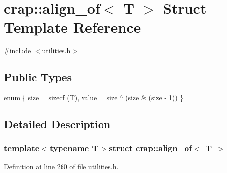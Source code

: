 \hypertarget{structcrap_1_1align__of}{\section{crap\+:\+:align\+\_\+of$<$ T $>$ Struct Template Reference}
\label{structcrap_1_1align__of}
}


{\ttfamily \#include $<$utilities.\+h$>$}

\subsection*{Public Types}
\begin{DoxyCompactItemize}
\item 
enum \{ \hyperlink{structcrap_1_1align__of_ae6e1e0ba0f4e74c10d92aa8849e230e5a8b5c1072cbffe59ec024940bd1bcbe2b}{size} = sizeof (T), 
\hyperlink{structcrap_1_1align__of_ae6e1e0ba0f4e74c10d92aa8849e230e5a681bb33919188c1863cff58c23b72e69}{value} = size $^\wedge$ (size \& (size -\/ 1))
 \}
\end{DoxyCompactItemize}


\subsection{Detailed Description}
\subsubsection*{template$<$typename T$>$struct crap\+::align\+\_\+of$<$ T $>$}



Definition at line 260 of file utilities.\+h.



